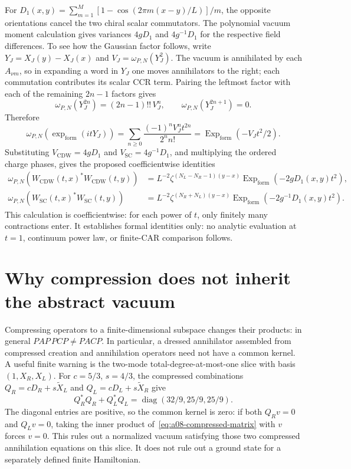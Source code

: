 For $D_1(x,y)=\sum_{m=1}^M[1-\cos(2\pi m(x-y)/L)]/m$, the opposite
orientations cancel the two chiral scalar commutators. The polynomial vacuum
moment calculation gives variances $4gD_1$ and $4g^{-1}D_1$ for the respective
field differences. To see how the Gaussian factor follows, write
$Y_J=X_J(y)-X_J(x)$ and $V_J=\omega_{P,N}(Y_J^2)$. The vacuum is annihilated
by each $A_{\nu m}$, so in expanding a word in $Y_J$ one moves annihilators
to the right; each commutation contributes its scalar CCR term. Pairing the
leftmost factor with each of the remaining $2n-1$ factors gives
\[
 \omega_{P,N}(Y_J^{2n})=(2n-1)!!\,V_J^n,\qquad
 \omega_{P,N}(Y_J^{2n+1})=0.
\]
Therefore
\[
 \omega_{P,N}(\exp_{\mathrm{form}}(itY_J))
 =\sum_{n\geq0}\frac{(-1)^n V_J^n t^{2n}}{2^n n!}
 =\operatorname{Exp}_{\mathrm{form}}(-V_Jt^2/2).
\]
Substituting $V_{\mathrm{CDW}}=4gD_1$ and
$V_{\mathrm{SC}}=4g^{-1}D_1$, and multiplying the ordered charge phases,
gives the proposed coefficientwise identities
\begin{align}
 \omega_{P,N}(W_{\mathrm{CDW}}(t,x)^*W_{\mathrm{CDW}}(t,y))
 &=L^{-2}\zeta^{(N_L-N_R-1)(y-x)}
       \operatorname{Exp}_{\mathrm{form}}(-2gD_1(x,y)t^2),\\
 \omega_{P,N}(W_{\mathrm{SC}}(t,x)^*W_{\mathrm{SC}}(t,y))
 &=L^{-2}\zeta^{(N_R+N_L)(y-x)}
       \operatorname{Exp}_{\mathrm{form}}(-2g^{-1}D_1(x,y)t^2).
 \label{eq:a08-formal-correlators}
\end{align}
This calculation is coefficientwise: for each power of $t$, only finitely
many contractions enter. It establishes formal identities only: no analytic evaluation
at $t=1$, continuum power law, or finite-CAR comparison follows.

\section{Why compression does not inherit the abstract vacuum}

Compressing operators to a finite-dimensional subspace changes their products:
in general $PAP\,PCP\ne PACP$. In particular, a dressed annihilator assembled
from compressed creation and annihilation operators need not have a common
kernel. A useful finite warning is the two-mode total-degree-at-most-one slice
with basis $(1,X_R,X_L)$. For $c=5/3$, $s=4/3$, the compressed combinations
$Q_R=cD_R+s\widetilde X_L$ and $Q_L=cD_L+s\widetilde X_R$ give
\begin{equation}
 Q_R^*Q_R+Q_L^*Q_L=\operatorname{diag}(32/9,25/9,25/9).
 \label{eq:a08-compressed-matrix}
\end{equation}
The diagonal entries are positive, so the common kernel is zero: if both
$Q_Rv=0$ and $Q_Lv=0$, taking the inner product of~\eqref{eq:a08-compressed-matrix}
with $v$ forces $v=0$. This rules out a normalized vacuum satisfying those
two compressed annihilation equations on this slice. It does not rule out a
ground state for a separately defined finite Hamiltonian.

